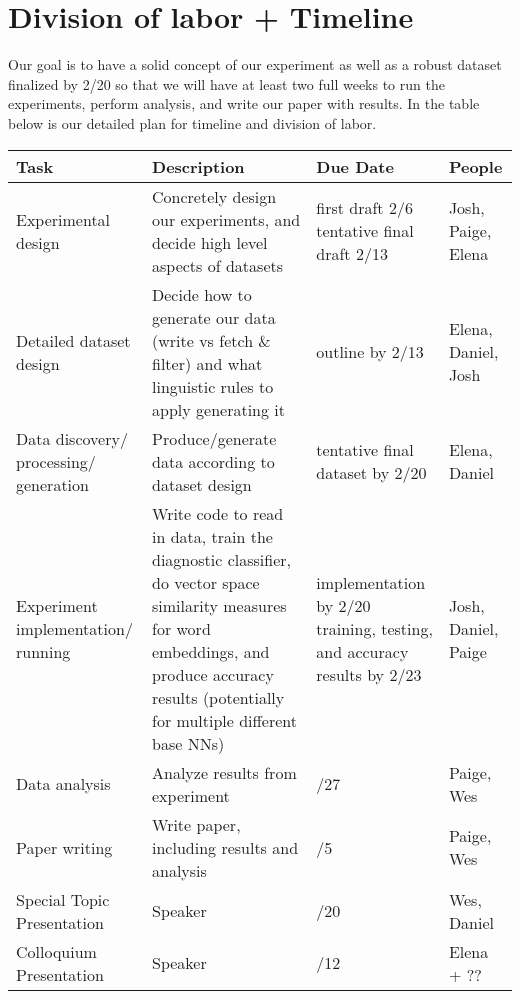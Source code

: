 \documentclass[11pt,a4paper]{article}
\begin{document}
\section{Division of labor + Timeline}
Our goal is to have a solid concept of our experiment as well as a robust dataset finalized by 2/20 so that we will have at least two full weeks to run the experiments, perform analysis, and write our paper with results. In the table below is our detailed plan for timeline and division of labor.

\clearpage

\begin{tabularx}{1.01\textwidth} { 
  | >{\raggedright\arraybackslash}X 
  | >{\centering\arraybackslash}X 
  | >{\centering\arraybackslash}X 
  | >{\raggedleft\arraybackslash}X | }
 \hline
 \textbf{Task} & \textbf{Description} & \textbf{Due Date}  & \textbf{People} \\
 \hline
 Experimental design  &  Concretely design our experiments, and decide high level aspects of datasets
 & {first draft 2/6 \newline
 tentative final draft 2/13} & Josh, Paige, Elena \\
  \hline
 Detailed dataset design  & Decide how to generate our data (write vs fetch \newline \& filter) and what linguistic rules to apply generating 
 it
  & outline by 2/13 & Elena, Daniel, Josh \\
      \hline
 Data discovery\// processing\// generation  & Produce\//generate data according to dataset design
  & tentative final dataset by 2/20 & Elena, Daniel \\
  
      \hline
Experiment implementation\// running & Write code to read in data, train the diagnostic classifier, do vector space similarity measures for word embeddings, and produce accuracy results (potentially for multiple different base NNs)

  &  implementation by 2/20 \newline \newline
  training, testing, and accuracy results by 2/23 & Josh, Daniel, Paige \\
  
   \hline
 Data analysis & Analyze results from experiment
  &  2/27 & Paige, Wes \\
    
   \hline
 Paper writing & Write paper, including results and analysis
  &  3/5 & Paige, Wes \\
   \hline
Special Topic Presentation & Speaker
  &  2/20 & Wes, Daniel \\
     \hline
Colloquium Presentation
 & Speaker
  &  3/12 & Elena + ?? \\
  
  

\hline
\end{tabularx}
\clearpage


\end{document}
